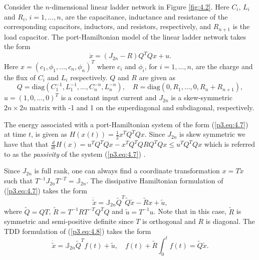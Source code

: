 Consider the $n$-dimensional linear ladder network in Figure \ref{fig:4.2}. Here $C_i$, $L_i$ and $R_i$, $i=1,\dots,n$, are the capacitance, inductance and resistance of the corresponding capacitors, inductors, and resistors, respectively, and $R_{n+1}$ is the load capacitor. The port-Hamiltonian model of the linear ladder network takes the form
\begin{equation} \label{p3.eq:4.7}
		\dot x = (J_{2n} - R)Q^TQx + u.
\end{equation}
Here $x = (c_1,\phi_1,\dots,c_n,\phi_n)^T$ where $c_i$ and $\phi_i$, for $i=1,\dots,n$, are the charge and the flux of $C_i$ and $L_i$ respectively. $Q$ and $R$ are given as
\begin{equation}
	Q = \text{diag}(C_1^{-1},L_1^{-1},\dots,C_n^{-n},L_n^{-n}), \quad R = \text{diag}(0,R_1,\dots,0,R_n+R_{n+1}),
\end{equation}
$u=(1,0,\dots,0)^T$ is a constant input current and $J_{2n}$ is a skew-symmetric $2n\times 2n$ matrix with -1 and 1 on the superdiagonal and subdiagonal, respectively. 

The energy associated with a port-Hamiltonian system of the form (\ref{p3.eq:4.7}) at time $t$, is given as $H(x(t)) = \frac 1 2 x^T Q^T Q x$. Since $J_{2n}$ is skew symmetric we have that that $\frac d {dt} H(x) = u^T Q^T Q x - x^T Q^T Q R Q^T Q x \leq u^T Q^T Q x$ which is referred to as the \emph{passivity} of the system (\ref{p3.eq:4.7}) \cite{vanderSchaft:1996es,Willems:1972ek}.

Since $J_{2n}$ is full rank, one can always find a coordinate transformation $ x= T \tilde x$ such that $T^{-1} J_{2n} T^{-T} = \mathbb J_{2n}$. The dissipative Hamiltonian formulation of (\ref{p3.eq:4.7}) takes the form
\begin{equation} \label{p3.eq:4.8}
	\dot {\tilde x} = \mathbb J_{2n} \tilde Q^T\tilde Q \tilde x - \tilde Rx + \tilde u,
\end{equation}
where $\tilde Q = QT$, $\tilde R = T^{-1}RT^{-T}Q^TQ$ and $\tilde u = T^{-1} u$. Note that in this case, $\tilde R$ is symmetric and semi-positive definite since $T$ is orthogonal and $R$ is diagonal. The TDD formulation of (\ref{p3.eq:4.8}) takes the form
\begin{equation} \label{p3.eq:4.9}
	\dot{\tilde x} = \mathbb{J}_{2n} \tilde Q^T f(t) + \tilde u, \quad f(t) + \tilde R \int_0^t f(t) = \tilde Q \tilde x.
\end{equation}



